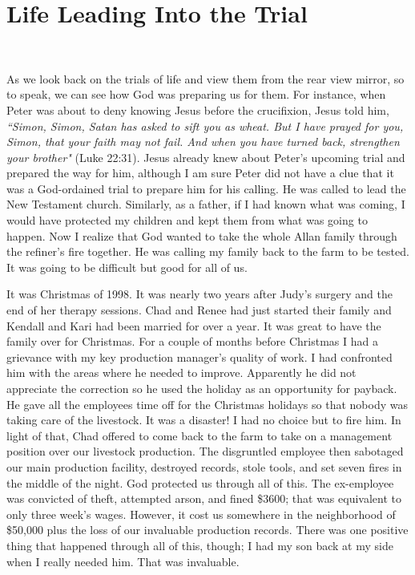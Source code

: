 \documentclass[oneside,12pt]{book}
\begin{document}
\section{Life Leading Into the Trial}
\

As we look back on the trials of life and view them from the rear view mirror, so to speak, we can see how God was preparing us for them. For instance, when Peter was about to deny knowing Jesus before the crucifixion, Jesus told him, \textit{``Simon, Simon, Satan has asked to sift you as wheat. But I have prayed for you, Simon, that your faith may not fail. And when you have turned back, strengthen your brother"} (Luke 22:31). Jesus already knew about Peter's upcoming trial and  prepared the way for him, although I am sure Peter did not have a clue that it was a God-ordained trial to prepare him for his calling. He was called to lead the New Testament church. Similarly, as a father, if I had known what was coming, I would have protected my children and kept them from what was going to happen. Now I realize that God wanted to take the whole Allan family through the refiner's fire together. He was calling my family back to the farm to be tested. It was going to be difficult but good for all of us. 

It was Christmas of 1998. It was nearly two years after Judy's surgery and the end of her therapy sessions. Chad and Renee had just started their family and Kendall and Kari had been married for over a year. It was great to have the family over for Christmas. For a couple of months before Christmas I had a grievance with my key production manager's quality of work. I had confronted him with the areas where he needed to improve. Apparently he did not appreciate the correction so he used the holiday as an opportunity for payback. He gave all the employees time off for the Christmas holidays so that nobody was taking care of the livestock. It was a disaster! I had no choice but to fire him. In light of that, Chad offered to come back to the farm to take on a management position over our livestock production. The disgruntled employee then sabotaged our main production facility, destroyed records, stole tools, and set seven fires in the middle of the night. God protected us through all of this. The ex-employee was convicted of theft, attempted arson, and fined \$3600; that was equivalent to only three week's wages. However, it cost us somewhere in the neighborhood of \$50,000 plus the loss of our invaluable production records. There was one positive thing that happened through all of this, though; I had my son back at my side when I really needed him. That was invaluable.
\end{document}
